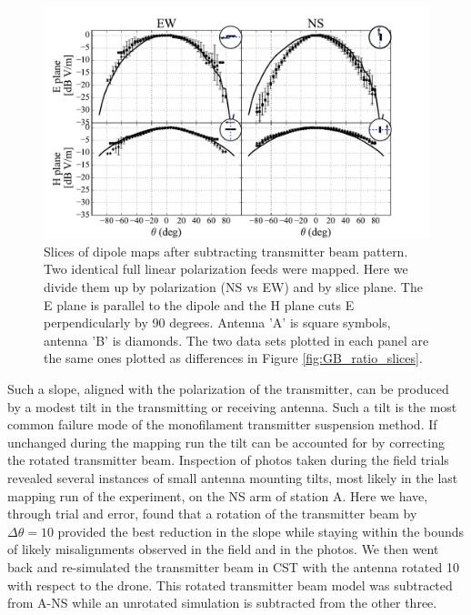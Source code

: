 \documentclass[preprint2,numberedappendix,tighten,twocolappendix]{aastex6}
\begin{document}
\begin{figure}
\begin{minipage}{0.45\textwidth}
\caption{Ratios between calibration dipoles measured by Orbcomm and ECHO methods.  The ECHO NS map for antenna A has been corrected for a 10\arcdeg transmitter antenna tilt by rotating the transmitter model. The little circular glyph indicates polarization and slice geometry: the receiving polarization is a thick line, the transmitter polarization is a thin arrow and the slice through the map is a blue dotted line. Note that through the mapping process the transmitter polarization is held fixed. }\label{fig:GB_ratio_slices}
\includegraphics[width=\columnwidth]{figures/GB_slices_quad.pdf}
\caption{Slices of dipole maps after subtracting transmitter beam pattern. Two identical full linear polarization feeds were mapped.  Here we divide them up by polarization (NS vs EW) and by slice plane. The E plane is parallel to the dipole  and the H plane cuts E perpendicularly by 90 degrees.  Antenna 'A' is square symbols, antenna 'B' is diamonds. The two data sets plotted in each panel are the same ones plotted as differences in Figure \ref{fig:GB_ratio_slices}. }\label{fig:GB_slices_quad}
\end{minipage}\hfill
\end{figure}



Such a slope, aligned with the polarization of the transmitter, can be produced by a modest tilt in the transmitting or receiving antenna. Such a tilt is the most common failure mode of the monofilament transmitter suspension method. If unchanged during the mapping run the tilt can be accounted for by correcting the rotated transmitter beam.  Inspection of photos taken during the field trials revealed several instances of small antenna mounting tilts, most likely in the last mapping run of the experiment, on the NS arm of station A. Here we have, through trial and error, found that a rotation of the transmitter beam by $\Delta \theta = 10$\arcdeg{} provided the best reduction in the slope while staying within the bounds of likely misalignments observed in the field and in the photos. We then went back and re-simulated the transmitter beam in CST with the antenna rotated 10\arcdeg{} with respect to the drone. This rotated transmitter beam model was subtracted from A-NS while an unrotated simulation is subtracted from the other three.
\end{document}
